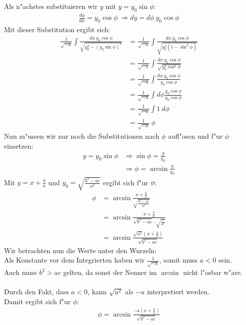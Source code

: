 \documentclass{theozettel}
\begin{document}
Als n"achstes substituieren wir $y$ mit $y= y_0 \sin{\phi}$:
\begin{align*}
\frac{dy}{d\phi}=y_0 \cos{\phi} \ \Rightarrow dy = d\phi \ y_0 \cos{\phi}
\end{align*}
Mit dieser Substitution ergibt sich:
\begin{align*}
\frac{1}{\sqrt{-a}}\int{\frac{d\phi \ y_0 \cos{\phi}}{\sqrt{y_0^2- \left(y_0 \sin{\phi}\right)^2}}}&= \frac{1}{\sqrt{-a}}\int{\frac{d\phi \ y_0 \cos{\phi}}{\sqrt{y_0^2\left(1- \sin^2{\phi}\right)}}}\\
&=\frac{1}{\sqrt{-a}}\int{\frac{d\phi \ y_0 \cos{\phi}}{\sqrt{y_0^2\cos^2{\phi}}}}\\
&=\frac{1}{\sqrt{-a}}\int{\frac{d\phi \ y_0 \cos{\phi}}{y_0\cos{\phi}}}\\
&=\frac{1}{\sqrt{-a}}\int{d\phi\frac{y_0\cos{\phi}}{y_0\cos{\phi}}}\\
&=\frac{1}{\sqrt{-a}}\int{1 \ d\phi}\\
&= \frac{1}{\sqrt{-a}} \ \phi
\end{align*}
Nun m"ussen wir nur noch die Substitutionen nach $\phi$ aufl"osen und f"ur $\phi$ einsetzen:
\begin{align*}
 y=y_0 \sin{\phi} &\Rightarrow \sin{\phi}=\frac{y}{y_0}\\
 &\Rightarrow \phi = \arcsin{\frac{y}{y_0}}
\end{align*}
Mit $y= x + \frac{b}{a}$ und $y_0 = \sqrt{\frac{b^2-ac}{a^2}}$ ergibt sich f"ur $\phi$:
\begin{align*}
\phi &= \arcsin{\frac{x + \frac{b}{a}}{\sqrt{\frac{b^2-ac}{a^2}}}}\\
&= \arcsin{\frac{x + \frac{b}{a}}{\sqrt{b^2-ac}\cdot\sqrt{\frac{1}{a^2}}}}\\
&= \arcsin{\frac{\sqrt{a^2}\left(x+\frac{b}{a}\right)}{\sqrt{b^2-ac}}}
\end{align*}
Wir betrachten nun die Werte unter den Wurzeln:\\
Als Konstante vor dem Integrierten haben wir $\frac{1}{\sqrt{-a}}$, somit muss $a<0$ sein.\\
Auch muss $b^2>ac$ gelten, da sonst der Nenner im $\arcsin$ nicht l"osbar w"are.\\\\
Durch den Fakt, dass $a<0$, kann $\sqrt{a^2}$ als $-a$ interpretiert werden.\\
Damit ergibt sich f"ur $\phi$:
\begin{align*}
\phi= \arcsin{\frac{-a\left(x+\frac{b}{a}\right)}{\sqrt{b^2-ac}}}\\
\end{align*} 
\end{document}
